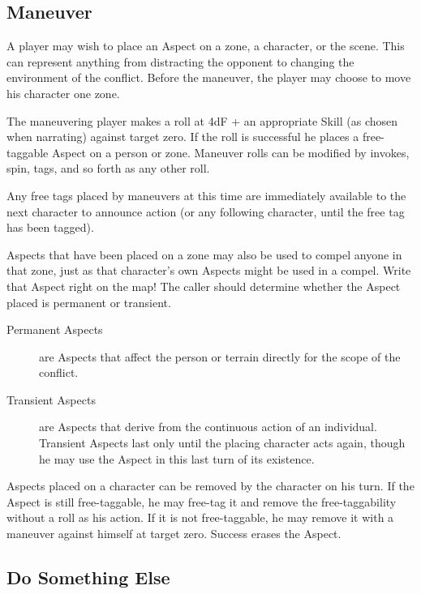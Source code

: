 \subsection{Maneuver}\label{sec:personal-combat-maneuver}

A player may wish to place an Aspect on a zone, a character, or the scene. This can represent anything from distracting the opponent to changing the environment of the conflict.  Before the maneuver, the player may choose to move his character one zone.

The maneuvering player makes a roll at 4dF + an appropriate Skill (as chosen when narrating) against target zero. If the roll is successful he places a free-taggable Aspect on a person or zone. Maneuver rolls can be modified by invokes, spin, tags, and so forth as any other roll.

Any free tags placed by maneuvers at this time are immediately available to the next character to announce action (or any following character, until the free tag has been tagged).

Aspects that have been placed on a zone may also be used to compel anyone in that zone, just as that character's own Aspects might be used in a compel. Write that Aspect right on the map! The caller should determine whether the Aspect placed is permanent or transient.

\begin{description}
\item[Permanent Aspects]
are Aspects that affect the person or terrain directly for the scope of the conflict.
\item[Transient Aspects]
are Aspects that derive from the continuous action of an individual. Transient Aspects last only until the placing character acts again, though he may use the Aspect in this last turn of its existence.
\end{description}

Aspects placed on a character can be removed by the character on his turn. If the Aspect is still free-taggable, he may free-tag it and remove the free-taggability without a roll as his action. If it is not free-taggable, he may remove it with a maneuver against himself at target zero. Success erases the Aspect.

\subsection{Do Something Else}\label{sec:personal-combat-do-something-else}

